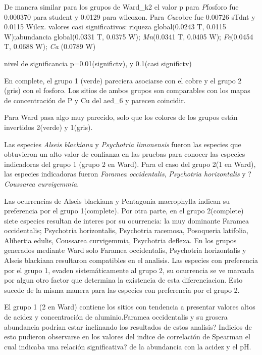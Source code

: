 \documentclass[11pt,]{article}
\begin{document}
De manera similar para los grupos de Ward\_k2 el valor p para
\emph{P}fosforo fue 0.000370 para student y 0.0129 para wilcoxon. Para
\emph{Cu}cobre fue 0.00726 sTdnt y 0.0115 Wilcx. valores casi
significativos: riqueza global(0.0243 T, 0.0115 W);abundancia
global(0.0331 T, 0.0375 W); \emph{Mn}(0.0341 T, 0.0405 W);
\emph{Fe}(0.0454 T, 0.0688 W); \emph{Ca} (0.0789 W)

nivel de significancia p=0.01(significtv), y 0.1(casi significtv)

En complete, el grupo 1 (verde) pareciera asociarse con el cobre y el
grupo 2 (gris) con el fosforo. Los sitios de ambos grupos son
comparables con los mapas de concentración de P y Cu del aed\_6 y
parecen coincidir.

Para Ward pasa algo muy parecido, solo que los colores de los grupos
están invertidos 2(verde) y 1(gris).

Las especies \emph{Alseis blackiana} y \emph{Psychotria limonensis}
fueron las especies que obtuvieron un alto valor de confianza en las
pruebas para conocer las especies indicadoras del grupo 1 (grupo 2 en
Ward). Para el caso del grupo 2(1 en Ward), las especies indicadoras
fueron \emph{Faramea occidentalis}, \emph{Psychotria horizontalis} y
?\emph{Coussarea curvigemmia}.

Las ocurrencias de Alseis blackiana y Pentagonia macrophylla indican su
preferencia por el grupo 1(complete). Por otra parte, en el grupo
2(complete) siete especies resultan de interes por su ocurrencia: la muy
dominante Faramea occidentalis; Psychotria horizontalis, Psychotria
racemosa, Posoqueria latifolia, Alibertia edulis, Coussarea curvigemmia,
Psychotria deflexa. En los grupos generados mediante Ward solo Faramea
occidentalis, Psychotria horizontalis y Alseis blackiana resultaron
compatibles en el analisis. Las especies con preferencia por el grupo 1,
evaden sistemáticamente al grupo 2, su ocurrencia se ve marcada por
algun otro factor que determina la existencia de esta diferenciacion.
Esto sucede de la misma manera para las especies con preferencia por el
grupo 2.

El grupo 1 (2 en Ward) contiene los sitios con tendencia a presentar
valores altos de acidez y concentración de aluminio.Faramea occidentalis
y su grosera abundancia podrían estar inclinando los resultados de estos
analisis? Indicios de esto pudieron observarse en los valores del indice
de correlación de Spearman el cual indicaba una relación significativa?
de la abundancia con la acidez y el pH.
\end{document}
